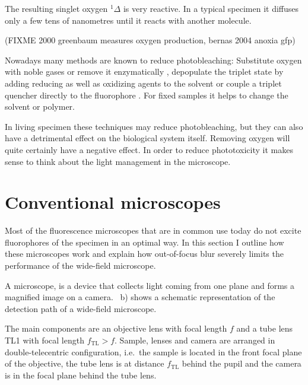 The resulting singlet oxygen ${}^1\Delta$ is very reactive. In a
typical specimen it diffuses only a few tens of nanometres until it
reacts with another molecule.

(FIXME 2000 greenbaum measures oxygen production, bernas 2004 anoxia gfp)

Nowadays many methods are known to reduce photobleaching: Substitute
oxygen with noble gases or remove it enzymatically
\citep[p.~89]{Sauer2011}, depopulate the triplet state by adding
reducing as well as oxidizing agents to the solvent
\citep{Vogelsang2008} or couple a triplet quencher directly to the
fluorophore \citep[p.~19]{Sauer2011}. For fixed samples it helps to
change the solvent or polymer.
 
In living specimen these techniques may reduce photobleaching, but
they can also have a detrimental effect on the biological system
itself. Removing oxygen will quite certainly have a negative
effect. In order to reduce phototoxicity it makes sense to think about
the light management in the microscope.


\section{Conventional microscopes}
\begin{summary}
  Most of the fluorescence microscopes that are in common use today do
  not excite fluorophores of the specimen in an optimal way. In
  this section I outline how these microscopes work and explain how
  out-of-focus blur severely limits the performance of the wide-field
  microscope.
\end{summary}


A microscope, is a device that collects light coming from one plane  
and forms a magnified image on a
camera. ~b) shows a schematic
representation of the detection path of a wide-field microscope.

The main components are an objective lens with focal length $f$ and a 
tube lens TL1 with focal length $f_\textrm{TL}>f$. Sample, lenses and
camera are arranged in double-telecentric configuration, i.e.\ the
sample is located in the front focal plane of the objective, the tube
lens is at distance $f_\textrm{TL}$ behind the pupil and the camera is
in the focal plane behind the tube lens.




